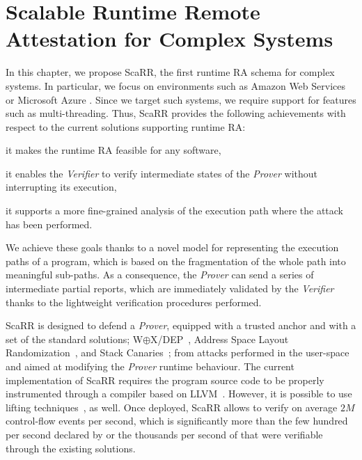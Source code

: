 \chapter{Scalable Runtime Remote Attestation for Complex Systems} %
\label{chp:runtime-protection-untrusted} 

In this chapter, we propose ScaRR, the first runtime RA schema for complex 
systems.
In particular, we focus on environments such as Amazon Web Services \citep{aws}
or Microsoft Azure \citep{azure_1}. 
Since we target such systems, we require support for features such as 
multi-threading.
Thus, ScaRR provides the following achievements with respect to the current 
solutions supporting runtime RA: 
\begin{enumerate*}[label=(\roman*)]
	\item it makes the runtime RA feasible for any software,
	\item it enables the \emph{Verifier} to verify intermediate states of the 
	\emph{Prover} without interrupting its execution,
	\item it supports a more fine-grained analysis of the execution path where 
	the attack has been performed. 
\end{enumerate*}
We achieve these goals thanks to a novel model for representing the execution 
paths of a program, which is based on the fragmentation of the whole path into 
meaningful sub-paths. As a consequence, the \emph{Prover} can send a series of 
intermediate partial reports, which are immediately validated by the 
\emph{Verifier} thanks to the lightweight verification procedures performed.  

ScaRR is designed to defend a \emph{Prover}, equipped with a trusted anchor and 
with a set of the standard solutions; \eg 
W$\oplus$X/DEP~\citep{pinzari2003introduction}, Address Space Layout 
Randomization~\citep{kil2006address}, and Stack 
Canaries~\citep{baratloo2000transparent}; from attacks performed in the 
user-space and aimed at modifying the \emph{Prover} runtime behaviour. The 
current implementation of ScaRR requires the program source code to be properly 
instrumented through a compiler based on LLVM~\citep{lattner2004llvm}. However, 
it is possible to use lifting techniques~\citep{mcsema}, as well. 
Once deployed, ScaRR allows to verify on average $2M$ control-flow events per 
second, which is significantly more than the few hundred 
per second declared by \cite{Dessouky:2018:LLH:3240765.3240821} or the 
thousands per second of \cite{aberadiat} that were verifiable through the 
existing solutions.

